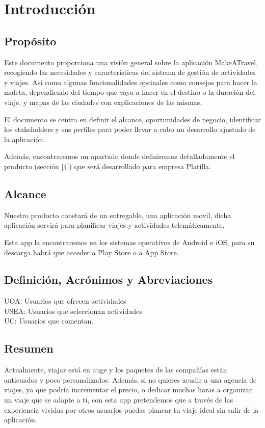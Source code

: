 \documentclass[11pt]{article}
\begin{document}
\tableofcontents
\newpage

\section{Introducción}
\subsection{Propósito}
Este documento proporciona una visión general sobre la aplicación MakeATravel, recogiendo las necesidades y características del sistema de gestión de actividades y viajes. Así como algunas funcionalidades opcinales como consejos para hacer la maleta, dependiendo del tiempo que vaya a hacer en el destino o la duración del viaje, y mapas de las ciudades con explicaciones de las mismas.

El documento se centra en definir el alcance, oportunidades de negocio, identificar los stakeholders y sus perfiles para poder llevar a cabo un desarrollo ajustado de la aplicación.

Además, encontraremos un apartado donde definiremos detalladamente el producto (sección \ref{4}) que será desarrollado para empresa Platilla.


\subsection{Alcance}
Nuestro producto constará de un entregable, una aplicación movil, dicha aplicación servirá para planificar viajes y actividades telemáticamente.

Esta app la encontraremos en los sistemas operativos de Android e iOS, para su descarga habrá que acceder a Play Store o a App Store. 

\subsection{Definición, Acrónimos y Abreviaciones}

UOA: Usuarios que ofrecen actividades\\

USEA: Usuarios que seleccionan actividades\\

UC: Usuarios que comentan.

\subsection{Resumen}
Actualmente, viajar está en auge y los paquetes de las compañías están anticuados y poco personalizados. Además, si no quieres acudir a una agencia de viajes, ya que podría incrementar el precio, o dedicar muchas horas a organizar un viaje que se adapte a ti, con esta app pretendemos que a través de las experiencia vividas por otros usuarios puedas planear tu viaje ideal sin salir de la aplicación.
\end{document}
